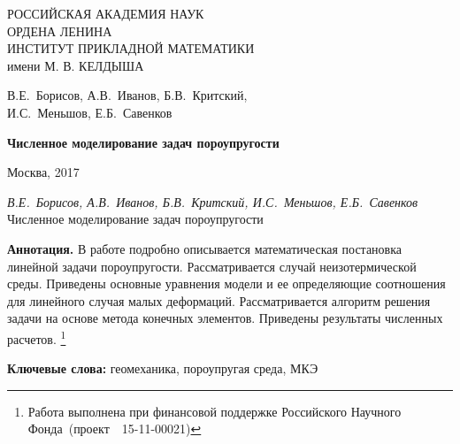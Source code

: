 \documentclass[a4paper, 12pt]{article}
\renewcommand{\No}{\textnumero}
\begin{document}
\begin{titlepage}

\begin{center}
РОССИЙСКАЯ АКАДЕМИЯ НАУК \\
ОРДЕНА ЛЕНИНА \\
ИНСТИТУТ ПРИКЛАДНОЙ МАТЕМАТИКИ \\
имени М. В. КЕЛДЫША

\vspace*{60mm}

\large{В.Е.~Борисов, А.В.~Иванов, Б.В.~Критский,\\
И.С.~Меньшов, Е.Б.~Савенков
}

\vspace*{20mm}

\textbf{\Large
Численное моделирование задач
пороупругости
}

\vspace*{110mm}

\Large{Москва, 2017}

\vspace*{-50mm}

\end{center}

\end{titlepage}

\setcounter{page}{2}

\thispagestyle{empty}

\noindent\emph{ В.Е.~Борисов, А.В.~Иванов, Б.В.~Критский,
И.С.~Меньшов, Е.Б.~Савенков} Численное моделирование задач
пороупругости

\vspace*{5mm}

\noindent\textbf{ Аннотация.}
%
В работе подробно описывается математическая постановка линейной
задачи пороупругости. Рассматривается случай неизотермической среды.
Приведены основные уравнения модели и ее определяющие соотношения для
линейного случая малых деформаций. Рассматривается алгоритм решения
задачи на основе метода конечных элементов. Приведены результаты
численных расчетов.
\footnote{Работа выполнена при финансовой поддержке Российского Научного Фонда~(проект~\No~15-11-00021)}

\vspace*{3mm}

\noindent\textbf{Ключевые слова:} геомеханика, пороупругая среда, МКЭ

\vspace*{6mm}
\end{document}
